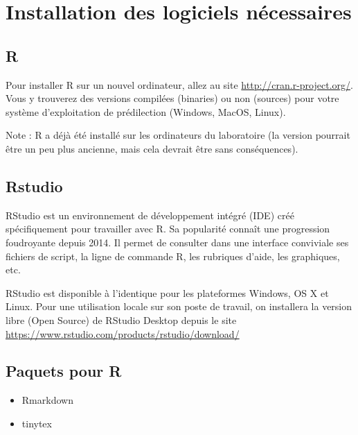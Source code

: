 \documentclass[
  12pt,
]{book}
\providecommand{\tightlist}{%
  \setlength{\itemsep}{0pt}\setlength{\parskip}{0pt}}
\begin{document}
\hypertarget{installation-des-logiciels-nuxe9cessaires}{%
\section*{Installation des logiciels nécessaires}\label{installation-des-logiciels-nuxe9cessaires}}

\hypertarget{r}{%
\subsection*{R}\label{r}}

Pour installer R sur un nouvel ordinateur, allez au site \url{http://cran.r-project.org/}.
Vous y trouverez des versions compilées (binaries) ou non (sources) pour votre système d'exploitation de prédilection (Windows, MacOS, Linux).

Note : R a déjà été installé sur les ordinateurs du laboratoire (la version pourrait être un peu plus ancienne, mais cela devrait être sans conséquences).

\hypertarget{rstudio}{%
\subsection*{Rstudio}\label{rstudio}}

RStudio est un environnement de développement intégré (IDE) créé spécifiquement pour travailler avec R. Sa popularité connaît une progression foudroyante depuis 2014.
Il permet de consulter dans une interface conviviale ses fichiers de script, la ligne de commande R, les rubriques d'aide,
les graphiques, etc.

RStudio est disponible à l'identique pour les plateformes Windows, OS X et Linux.
Pour une utilisation locale sur son poste de travail, on installera la version libre (Open Source) de RStudio Desktop depuis le site
\url{https://www.rstudio.com/products/rstudio/download/}

\hypertarget{paquets-pour-r}{%
\subsection*{Paquets pour R}\label{paquets-pour-r}}

\begin{itemize}
\tightlist
\item
  Rmarkdown
\item
  tinytex
\end{itemize}
\end{document}
